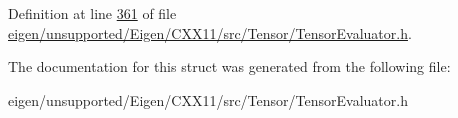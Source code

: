 Definition at line \hyperlink{eigen_2unsupported_2_eigen_2_c_x_x11_2src_2_tensor_2_tensor_evaluator_8h_source_l00361}{361} of file \hyperlink{eigen_2unsupported_2_eigen_2_c_x_x11_2src_2_tensor_2_tensor_evaluator_8h_source}{eigen/unsupported/\+Eigen/\+C\+X\+X11/src/\+Tensor/\+Tensor\+Evaluator.\+h}.



The documentation for this struct was generated from the following file\+:\begin{DoxyCompactItemize}
\item 
eigen/unsupported/\+Eigen/\+C\+X\+X11/src/\+Tensor/\+Tensor\+Evaluator.\+h\end{DoxyCompactItemize}

